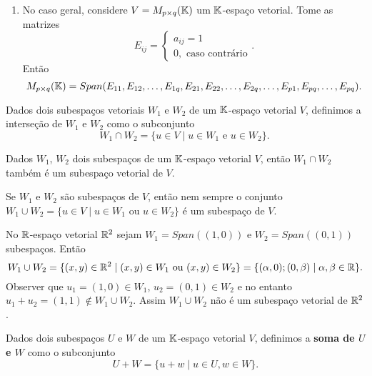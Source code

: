 \begin{exemplos}
\begin{enumerate}
        \item No caso geral, considere $V = M_{p \times q}(\mathbb{K})$ um $\mathbb{K}$-espaço vetorial. Tome as matrizes
         \[
            E_{ij} = \begin{cases}
                a_{ij} = 1\\
                0, \mbox{ caso contrário}
                \end{cases}.
         \]
         Então
         \[
            M_{p \times q}(\mathbb{K}) = Span(E_{11}, E_{12}, \dots, E_{1q}, E_{21}, E_{22}, \dots, E_{2q}, \dots, E_{p1}, E_{pq}, \dots, E_{pq}).
         \]
    \end{enumerate}
\end{exemplos}

\begin{definicao}
  Dados dois subespaços vetoriais $W_1$ e $W_2$ de um $\mathbb{K}$-espaço vetorial $V$, definimos a interseção de $W_1$ e $W_2$ como o subconjunto
  \[
    W_1 \cap W_2 = \{u \in V \mid u\in W_1 \mbox{ e } u \in W_2\}.\
  \]
\end{definicao}


\begin{teorema}
  Dados $W_1$, $W_2$ dois subespaços de um $\mathbb{K}$-espaço vetorial $V$, então $W_1 \cap W_2$ também é um subespaço vetorial de $V$.
\end{teorema}

\begin{observacao}
  Se $W_1$ e $W_2$ são subespaços de $V$, então nem sempre o conjunto $W_1 \cup W_2 = \{u \in V \mid u \in W_1 \mbox{ ou } u \in W_2\}$ é um subespaço de $V$.
\end{observacao}

\begin{exemplo}
  No $\mathbb{R}$-espaço vetorial $\mathbb{R}^2$ sejam $W_1 = Span((1,0))$ e $W_2 = Span((0, 1))$ subespaços. Então
  \[
    W_1 \cup W_2 = \{(x, y) \in \mathbb{R}^2 \mid (x, y) \in W_1 \mbox{ ou } (x, y) \in W_2\} = \{(\alpha, 0); (0, \beta) \mid \alpha, \beta \in \mathbb{R}\}.
  \]
  Observer que $u_1 = (1, 0) \in W_1$, $u_2 = (0, 1) \in W_2$ e no entanto $u_1 + u_2 = (1, 1) \notin W_1 \cup W_2$. Assim $W_1 \cup W_2$ não é um subespaço vetorial de $\mathbb{R}^2$.
\end{exemplo}

\begin{definicao}
  Dados dois subespaços $U$ e $W$ de um $\mathbb{K}$-espaço vetorial $V$, definimos a \textbf{soma de $U$ e $W$} como o subconjunto
  \[
    U + W = \{u + w \mid u \in U, w \in W\}.
  \]
\end{definicao}

